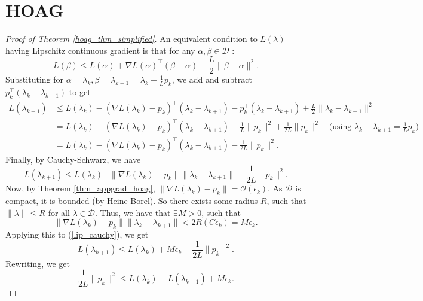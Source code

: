 \documentclass[11pt, twoside]{report}
\begin{document}
\section{HOAG}
\begin{proof}[Proof of Theorem \ref{hoag_thm_simplified}]
An equivalent condition to $L(\lambda)$ having Lipschitz continuous gradient is that for any $\alpha,\beta \in \mathcal{D}$ \cite{Zhou2018}:
\begin{equation} \label{lipschitz_equiv}
    L(\beta) \leq L(\alpha) + \nabla L(\alpha)^\top (\beta - \alpha) + \frac{L}{2}\|\beta - \alpha\|^2.
\end{equation}
Substituting for $\alpha = \lambda_k, \beta = \lambda_{k+1} = \lambda_k - \frac{1}{L}p_k$, we add and subtract $p_k^\top(\lambda_k - \lambda_{k-1})$ to get
\begin{align}
    L(\lambda_{k+1}) &\leq L(\lambda_k) - (\nabla L(\lambda_k) -p_k)^\top(\lambda_k - \lambda_{k+1}) -p_k^\top(\lambda_k - \lambda_{k+1})+\frac{L}{2}\|\lambda_k - \lambda_{k+1}\|^2 \\
    &= L(\lambda_k) - (\nabla L(\lambda_k) -p_k)^\top(\lambda_k - \lambda_{k+1}) -\frac{1}{L}\|p_k\|^2+\frac{1}{2L}\|p_k\|^2 \quad \text{(using } \lambda_{k}-\lambda_{k+1} = \frac{1}{L}p_k) \\
    &=L(\lambda_k) - (\nabla L(\lambda_k) -p_k)^\top(\lambda_k - \lambda_{k+1}) -\frac{1}{2L}\|p_k\|^2.
\end{align}
Finally, by Cauchy-Schwarz, we have
\begin{equation} \label{lip_cauchy}
    L(\lambda_{k+1}) \leq L(\lambda_k) + \|\nabla L(\lambda_k) -p_k\|\|\lambda_k - \lambda_{k+1}\| -\frac{1}{2L}\|p_k\|^2.
\end{equation}
Now, by Theorem \ref{thm_appgrad_hoag}, $\|\nabla L(\lambda_k) -p_k\| = \mathcal{O}(\epsilon_k)$. As $\mathcal{D}$ is compact, it is bounded (by Heine-Borel). So there exists some radius $R$, such that $\|\lambda\| \leq R$ for all $\lambda \in \mathcal{D}$. Thus, we have that $\exists M>0$, such that
\[\|\nabla L(\lambda_k) -p_k\|\|\lambda_k - \lambda_{k+1}\| < 2R(C \epsilon_k) = M\epsilon_k.\]
Applying this to (\ref{lip_cauchy}), we get
\begin{equation} \label{lip_cauchy_2}
    L(\lambda_{k+1}) \leq L(\lambda_k) + M\epsilon_k -\frac{1}{2L}\|p_k\|^2.
\end{equation}
Rewriting, we get
\begin{equation} \label{lam_bound}
    \frac{1}{2L}\|p_k\|^2 \leq L(\lambda_k) - L(\lambda_{k+1}) + M\epsilon_k.
\end{equation}

\end{proof}
\end{document}
